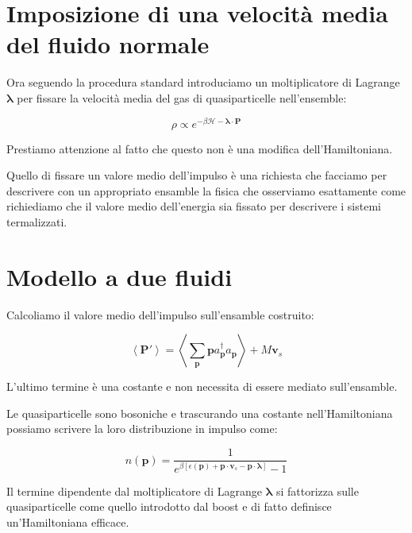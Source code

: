 \documentclass[12pt,a4paper]{article}
\begin{document}
{\section{Imposizione di una velocità media del fluido normale}

Ora seguendo la procedura standard introduciamo un moltiplicatore di Lagrange $\boldsymbol{\lambda}$ per fissare la velocità media del gas di quasiparticelle nell'ensemble:

\begin{equation}
\rho \propto e^{-\beta \mathcal{H} - \boldsymbol{\lambda} \cdot \mathbf{P}}
\end{equation}

Prestiamo attenzione al fatto che questo non è una modifica dell'Hamiltoniana. %


Quello di fissare un valore medio dell'impulso è una richiesta che facciamo per descrivere con un appropriato ensamble la fisica che osserviamo esattamente come richiediamo che il valore medio dell'energia sia fissato per descrivere i sistemi termalizzati. 

\section{Modello a due fluidi}
Calcoliamo il valore medio dell'impulso sull'ensamble costruito:

\begin{equation}
\left< \mathbf{P'} \right> = \left< \sum_{\mathbf{p}} \mathbf{p} a^{\dagger}_{\mathbf{p}} a_{\mathbf{p}} \right> + M \mathbf{v}_s
\end{equation}

L'ultimo termine è una costante e non necessita di essere mediato sull'ensamble.

Le quasiparticelle sono bosoniche e trascurando una costante nell'Hamiltoniana possiamo scrivere la loro distribuzione in impulso come:

\begin{equation}
n \left( \mathbf{p} \right) = \frac{1}{e^{\beta \left[ \epsilon ( \mathbf{p} ) + \mathbf{p} \cdot \mathbf{v}_s - \mathbf{p} \cdot \boldsymbol{\lambda} \right]} - 1}
\end{equation}

Il termine dipendente dal moltiplicatore di Lagrange $\boldsymbol{\lambda}$ si fattorizza sulle quasiparticelle come quello introdotto dal boost e di fatto definisce un'Hamiltoniana efficace.

}
\end{document}
